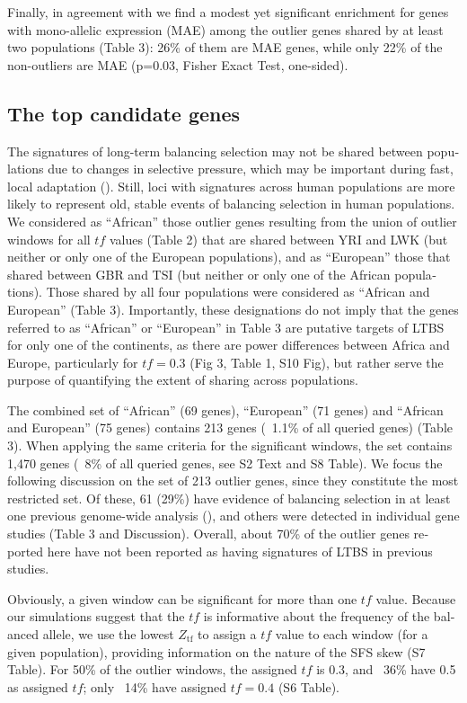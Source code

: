 \begin{refsection}
\begin{otherlanguage}{english}
Finally, in agreement with \textcite{Savova2016} we find a modest yet significant enrichment for genes with mono-allelic expression (MAE) among the outlier genes shared by at least two populations (Table 3): 26\% of them are MAE genes, while only 22\% of the non-outliers are MAE (p=0.03, Fisher Exact Test, one-sided).

\subsection{The top candidate genes}
The signatures of long-term balancing selection may not be shared between populations due to changes in selective pressure, which may be important during fast, local adaptation (\cite{DeFilippo2016}). Still, loci with signatures across human populations are more likely to represent old, stable events of balancing selection in human populations.  We considered as “African” those outlier genes resulting from the union of outlier windows for all $tf$ values (Table 2) that are shared between YRI and LWK (but neither or only one of the European populations), and as “European” those that shared between GBR and TSI (but neither or only one of the African populations). Those shared by all four populations were considered as “African and European” (Table 3). Importantly, these designations do not imply that the genes referred to as “African” or “European” in Table 3 are putative targets of LTBS for only one of the continents, as there are power differences between Africa and Europe, particularly for $tf=0.3$ (Fig 3, Table 1, S10 Fig), but rather serve the purpose of quantifying the extent of sharing across populations.

The combined set of “African” (69 genes), “European” (71 genes) and “African and European” (75 genes) contains 213 genes (~1.1\% of all queried genes) (Table 3). When applying the same criteria for the significant windows, the set contains 1,470 genes (~8\% of all queried genes, see S2 Text and S8 Table). We focus the following discussion on the set of 213 outlier genes, since they constitute the most restricted set. Of these, 61 (29\%) have evidence of balancing selection in at least one previous genome-wide analysis (\cite{Andres2009,DeGiorgio2014,Leffler2013a}), and others were detected in individual gene studies (Table 3 and Discussion). Overall, about 70\% of the outlier genes reported here have not been reported as having signatures of LTBS in previous studies.

Obviously, a given window can be significant for more than one $tf$ value. Because our simulations suggest that the $tf$ is informative about the frequency of the balanced allele, we use the lowest $Z_{\mathrm{tf}}$ to assign a $tf$ value to each window (for a given population), providing information on the nature of the SFS skew (S7 Table). For 50\% of the outlier windows, the assigned $tf$ is 0.3, and ~36\% have 0.5 as assigned $tf$; only ~14\% have assigned $tf=0.4$ (S6 Table). 


\end{otherlanguage}
\end{refsection}
